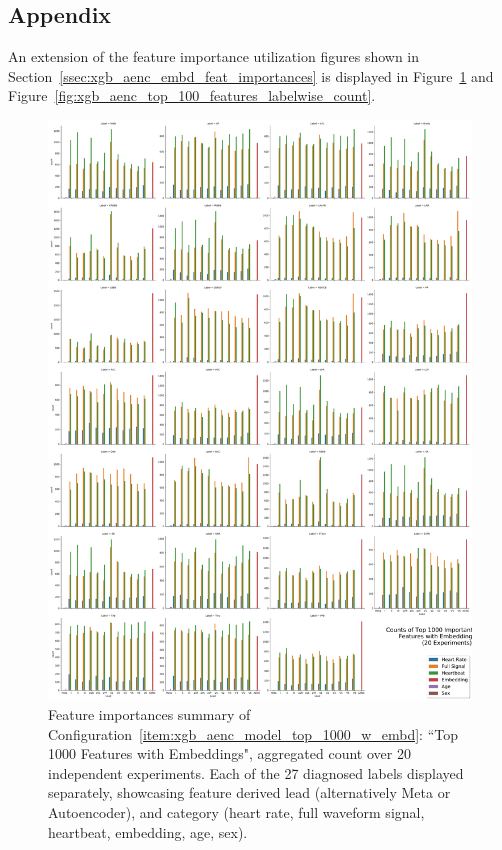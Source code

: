 \documentclass[\main/thesis.tex]{subfiles}
\begin{document}
\begin{appendices}
\chapter*{Appendix}

An extension of the feature importance utilization figures shown in Section~\ref{ssec:xgb_aenc_embd_feat_importances} is displayed in Figure~\ref{fig:xgb_aenc_top_1000_features_labelwise_count} and Figure~\ref{fig:xgb_aenc_top_100_features_labelwise_count}.


\begin{figure}[t]
    \centering
    \includegraphics[width=\textwidth]{figure/top_1000_feature_importances_all_w_embedding.pdf}
    \caption{Feature importances summary of Configuration~\ref{item:xgb_aenc_model_top_1000_w_embd}: ``Top 1000 Features with Embeddings", aggregated count over 20 independent experiments. Each of the 27 diagnosed labels displayed separately, showcasing feature derived lead (alternatively Meta or Autoencoder), and category (heart rate, full waveform signal, heartbeat, embedding, age, sex).}
    \label{fig:xgb_aenc_top_1000_features_labelwise_count}
\end{figure}


\end{appendices}
\end{document}
